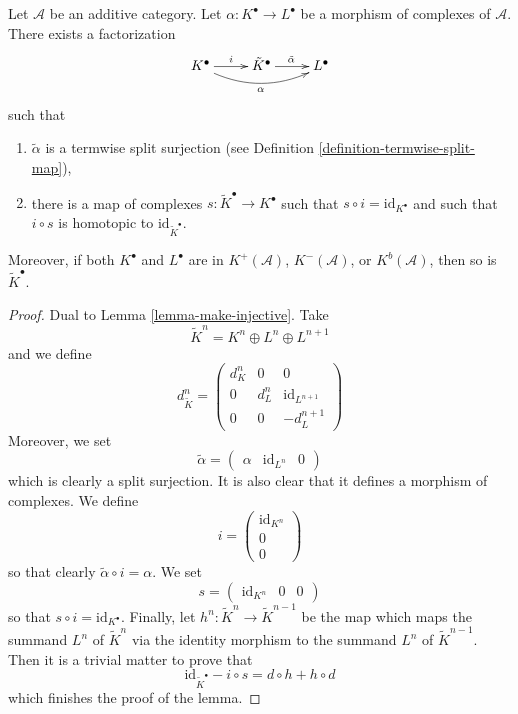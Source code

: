 \begin{lemma}
\label{lemma-make-surjective}
Let $\mathcal{A}$ be an additive category.
Let $\alpha : K^\bullet \to L^\bullet$ be a morphism
of complexes of $\mathcal{A}$.
There exists a factorization
$$
\xymatrix{
K^\bullet \ar[r]^i \ar@/_1pc/[rr]_\alpha &
\tilde K^\bullet \ar[r]^{\tilde \alpha} &
L^\bullet
}
$$
such that
\begin{enumerate}
\item $\tilde \alpha$ is a termwise split surjection (see
Definition \ref{definition-termwise-split-map}),
\item there is a map of complexes $s : \tilde K^\bullet \to K^\bullet$
such that $s \circ i = \text{id}_{K^\bullet}$ and such that
$i \circ s$ is homotopic to $\text{id}_{\tilde K^\bullet}$.
\end{enumerate}
Moreover, if both $K^\bullet$ and $L^\bullet$ are in
$K^{+}(\mathcal{A})$, $K^{-}(\mathcal{A})$, or $K^b(\mathcal{A})$,
then so is $\tilde K^\bullet$.
\end{lemma}

\begin{proof}
Dual to
Lemma \ref{lemma-make-injective}.
Take
$$
\tilde K^n = K^n \oplus L^n \oplus L^{n + 1}
$$
and we define
$$
d^n_{\tilde K} =
\left(
\begin{matrix}
d^n_K & 0 & 0 \\
0 & d^n_L & \text{id}_{L^{n + 1}} \\
0 & 0 & -d^{n + 1}_L
\end{matrix}
\right)
$$
Moreover, we set
$$
\tilde \alpha =
\left(
\begin{matrix}
\alpha &
\text{id}_{L^n} &
0
\end{matrix}
\right)
$$
which is clearly a split surjection. It is also clear that it defines a
morphism of complexes. We define
$$
i =
\left(
\begin{matrix}
\text{id}_{K^n} \\
0 \\
0
\end{matrix}
\right)
$$
so that clearly $\tilde \alpha \circ i = \alpha$. We set
$$
s =
\left(
\begin{matrix}
\text{id}_{K^n} &
0 &
0
\end{matrix}
\right)
$$
so that $s \circ i = \text{id}_{K^\bullet}$. Finally,
let $h^n : \tilde K^n \to \tilde K^{n - 1}$ be the map
which maps the summand $L^n$ of $\tilde K^n$ via the identity morphism
to the summand $L^n$ of $\tilde K^{n - 1}$. Then it is a trivial matter
to prove that
$$
\text{id}_{\tilde K^\bullet} - i \circ s
=
d \circ h + h \circ d
$$
which finishes the proof of the lemma.
\end{proof}

